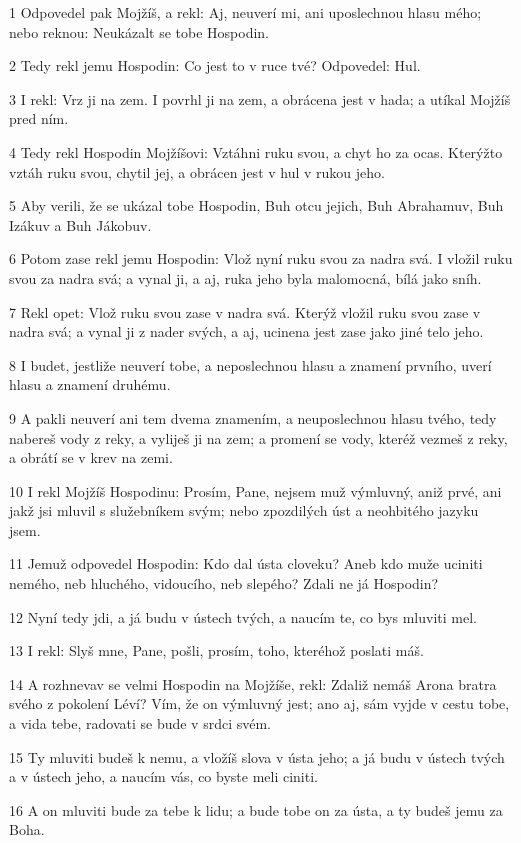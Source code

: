 \par 1 Odpovedel pak Mojžíš, a rekl: Aj, neuverí mi, ani uposlechnou hlasu mého; nebo reknou: Neukázalt se tobe Hospodin.
\par 2 Tedy rekl jemu Hospodin: Co jest to v ruce tvé? Odpovedel: Hul.
\par 3 I rekl: Vrz ji na zem. I povrhl ji na zem, a obrácena jest v hada; a utíkal Mojžíš pred ním.
\par 4 Tedy rekl Hospodin Mojžíšovi: Vztáhni ruku svou, a chyt ho za ocas. Kterýžto vztáh ruku svou, chytil jej, a obrácen jest v hul v rukou jeho.
\par 5 Aby verili, že se ukázal tobe Hospodin, Buh otcu jejich, Buh Abrahamuv, Buh Izákuv a Buh Jákobuv.
\par 6 Potom zase rekl jemu Hospodin: Vlož nyní ruku svou za nadra svá. I vložil ruku svou za nadra svá; a vynal ji, a aj, ruka jeho byla malomocná, bílá jako sníh.
\par 7 Rekl opet: Vlož ruku svou zase v nadra svá. Kterýž vložil ruku svou zase v nadra svá; a vynal ji z nader svých, a aj, ucinena jest zase jako jiné telo jeho.
\par 8 I budet, jestliže neuverí tobe, a neposlechnou hlasu a znamení prvního, uverí hlasu a znamení druhému.
\par 9 A pakli neuverí ani tem dvema znamením, a neuposlechnou hlasu tvého, tedy nabereš vody z reky, a vyliješ ji na zem; a promení se vody, kteréž vezmeš z reky, a obrátí se v krev na zemi.
\par 10 I rekl Mojžíš Hospodinu: Prosím, Pane, nejsem muž výmluvný, aniž prvé, ani jakž jsi mluvil s služebníkem svým; nebo zpozdilých úst a neohbitého jazyku jsem.
\par 11 Jemuž odpovedel Hospodin: Kdo dal ústa cloveku? Aneb kdo muže uciniti nemého, neb hluchého, vidoucího, neb slepého? Zdali ne já Hospodin?
\par 12 Nyní tedy jdi, a já budu v ústech tvých, a naucím te, co bys mluviti mel.
\par 13 I rekl: Slyš mne, Pane, pošli, prosím, toho, kteréhož poslati máš.
\par 14 A rozhnevav se velmi Hospodin na Mojžíše, rekl: Zdaliž nemáš Arona bratra svého z pokolení Léví? Vím, že on výmluvný jest; ano aj, sám vyjde v cestu tobe, a vida tebe, radovati se bude v srdci svém.
\par 15 Ty mluviti budeš k nemu, a vložíš slova v ústa jeho; a já budu v ústech tvých a v ústech jeho, a naucím vás, co byste meli ciniti.
\par 16 A on mluviti bude za tebe k lidu; a bude tobe on za ústa, a ty budeš jemu za Boha.
